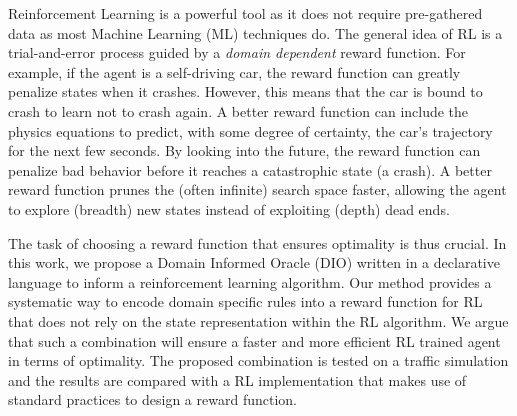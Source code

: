 \documentclass[a4paper,11pt]{article}
\theoremstyle{definition}
\begin{document}
\medskip

Reinforcement Learning is a powerful tool as it does not require
pre-gathered data as most Machine Learning (ML) techniques do. 
%
The general idea of RL is a trial-and-error process guided by a
\textit{domain dependent} reward function.
%
For example, if the agent is a self-driving car, the reward function
can greatly penalize states when it crashes.
%
However, this means that the car is bound to crash to learn not to
crash again.
%
A better reward function can include the physics equations to predict,
with some degree of certainty, the car's trajectory for the next few
seconds.
%
By looking into the future, the reward function can penalize bad
behavior before it reaches a catastrophic state (a crash).
%
A better reward function prunes the (often infinite) search space
faster, allowing the agent to explore (breadth) new states instead of
exploiting (depth) dead ends.
%

\medskip

The task of choosing a reward function that ensures optimality is thus
crucial. 
%
In this work, we propose a Domain Informed Oracle (DIO) written in a
declarative language to inform a reinforcement learning algorithm. 
%
Our method provides a systematic way to encode domain specific rules
into a reward function for RL that does not rely on the state
representation within the RL algorithm.
%
We argue that such a combination will ensure a faster and more
efficient RL trained agent in terms of optimality. 
%
The proposed combination is tested on a traffic simulation and the
results are compared with a RL implementation that makes use of
standard practices to design a reward function. 









\end{document}
